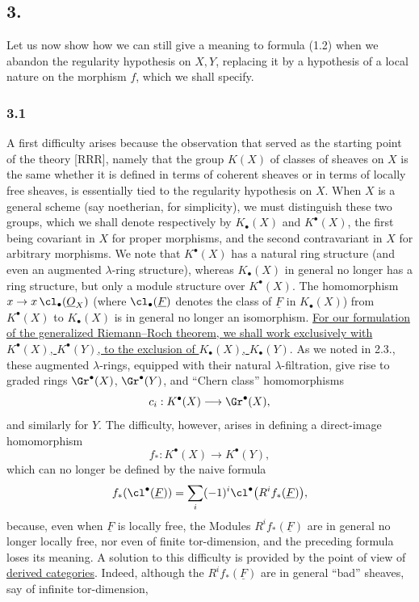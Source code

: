 \subsection*{3.}
Let us now show how we can still give a meaning to formula (1.2) when we abandon the regularity hypothesis on $X,Y$, replacing it by a hypothesis of a local nature on the morphism $f$, which we shall specify.

\subsubsection*{3.1}
A first difficulty arises because the observation that served as the starting point of the theory [RRR], namely that the group $K(X)$ of classes of sheaves on $X$ is the same whether it is defined in terms of coherent sheaves or in terms of locally free sheaves, is essentially tied to the regularity hypothesis on $X$. When $X$ is a general scheme (say noetherian, for simplicity), we must distinguish these two groups, which we shall denote respectively by $K_\bullet(X)$ and $K^\bullet(X)$, the first being covariant in $X$ for proper morphisms, and the second contravariant in $X$ for arbitrary morphisms. We note that $K^\bullet(X)$ has a natural ring structure (and even an augmented $\lambda$-ring structure), whereas $K_\bullet(X)$ in general no longer has a ring structure, but only a module structure over $K^\bullet(X)$. The homomorphism $x\to x\,\cl_\bullet(\underline O_X)$ (where $\cl_\bullet(\underline F)$ denotes the class of $\underline F$ in $K_\bullet(X)$) from $K^\bullet(X)$ to $K_\bullet(X)$ is in general no longer an isomorphism. \uline{For our formulation of the generalized Riemann--Roch theorem, we shall work exclusively with $K^\bullet(X)$, $K^\bullet(Y)$, to the exclusion of $K_\bullet(X)$, $K_\bullet(Y)$}. As we noted in 2.3., these augmented $\lambda$-rings, equipped with their natural $\lambda$-filtration, give rise to graded rings $\Gr^\bullet(X)$, $\Gr^\bullet(Y)$, and ``Chern class'' homomorphisms
\[
c_i:K^\bullet(X)\longrightarrow \Gr^\bullet(X),
\]
and similarly for $Y$. The difficulty, however, arises in defining a direct-image homomorphism
\begin{equation}\tag{3.1}
f_*:K^\bullet(X)\longrightarrow K^\bullet(Y),
\end{equation}
which can no longer be defined by the naive formula
\[
f_*(\cl^\bullet(\underline F))=\sum_i(-1)^i\cl^\bullet\bigl(R^if_*(\underline F)\bigr),
\]
because, even when $\underline F$ is locally free, the Modules $R^if_*(\underline F)$ are in general no longer locally free, nor even of finite tor-dimension, and the preceding formula loses its meaning. A solution to this difficulty is provided by the point of view of \underline{derived categories}. Indeed, although the $R^if_*(\underline F)$ are in general ``bad'' sheaves, say of infinite tor-dimension,

